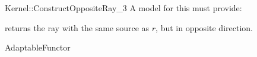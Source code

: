 \begin{ccRefFunctionObjectConcept}{Kernel::ConstructOppositeRay_3}
A model for this must provide:


{returns the ray with the same source as $r$, but in opposite direction.}

\ccRefines
AdaptableFunctor

\ccSeeAlso
{} \\

\end{ccRefFunctionObjectConcept}
